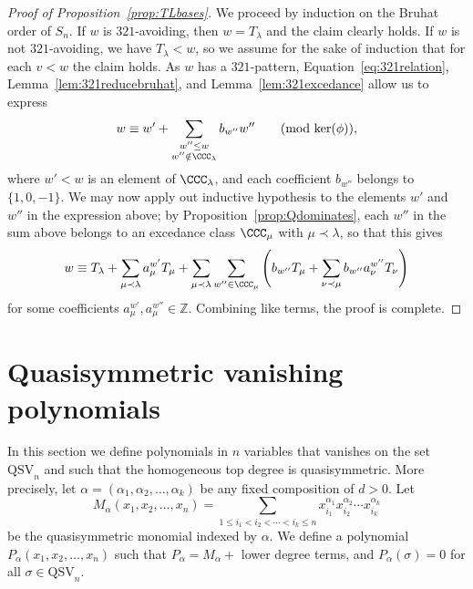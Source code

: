 \documentclass[12pt]{amsart}
\theoremstyle{definition}
\theoremstyle{remark}
\numberwithin{equation}{section}
\newcommand{\ZZ}{\mathbb{Z}}
\newcommand{\QSV}{\mathrm{QSV}}
\begin{document}
\begin{proof}[Proof of Proposition~\ref{prop:TLbases}]
We proceed by induction on the Bruhat order of $S_{n}$.  If $w$ is $321$-avoiding, then $w = T_{\lambda}$ and the claim clearly holds.  
If $w$ is not $321$-avoiding, we have $T_{\lambda} < w$, so we assume for the sake of induction that for each $v < w$ the claim holds.  
As $w$ has a $321$-pattern, Equation~\eqref{eq:321relation}, Lemma~\ref{lem:321reducebruhat}, and Lemma~\ref{lem:321excedance} allow us to express
\[
w \equiv w' + \sum_{\substack{w'' \le w \\ w'' \notin \CCC_{\lambda} }} b_{w''} w'' \qquad \text{(mod $\ker(\phi)$)},
\]
where $w' < w$ is an element of $\CCC_{\lambda}$, and each coefficient $b_{w''}$ belongs to $\{1, 0, -1\}$.  
We may now apply out inductive hypothesis to the elements $w'$ and $w''$ in the expression above; by Proposition~\ref{prop:Qdominates}, each $w''$ in the sum above belongs to an excedance class $\CCC_{\mu}$ with $\mu \prec \lambda$, so that this gives
\[
w \equiv T_{\lambda} + \sum_{\mu \prec \lambda} a_{\mu}^{w'} T_{\mu} + \sum_{\mu \prec \lambda} \sum_{w'' \in \CCC_{\mu}} \left( b_{w''} T_{\mu} + \sum_{\nu \prec \mu} b_{w''} a_{\nu}^{w''} T_{\nu}\right)
\]
for some coefficients $a_{\mu}^{w'}, a_{\mu}^{w''} \in \ZZ$.  Combining like terms, the proof is complete.
\end{proof}


\section{Quasisymmetric vanishing polynomials}
\label{sec:QSymvanish}


In this section we define polynomials in $n$ variables that vanishes on the set $\QSV_n$ and such that
the homogeneous top degree is quasisymmetric. More precisely, let $\alpha=(\alpha_1,\alpha_2,\ldots,\alpha_k)$
be any fixed composition of $d>0$. Let 
	$$M_\alpha(x_1,x_2,\ldots,x_n)=\sum_{1\le i_1<i_2<\cdots<i_k\le n} x_{i_1}^{\alpha_1} x_{i_2}^{\alpha_2}\cdots  x_{i_k}^{\alpha_k}$$
be the quasisymmetric monomial indexed by $\alpha$. We  define a polynomial $P_\alpha(x_1,x_2,\ldots,x_n)$ such that
  $P_\alpha = M_\alpha +$  lower degree terms, and  $P_\alpha(\sigma)=0$  for all $\sigma\in \QSV_n$.

\end{document}
